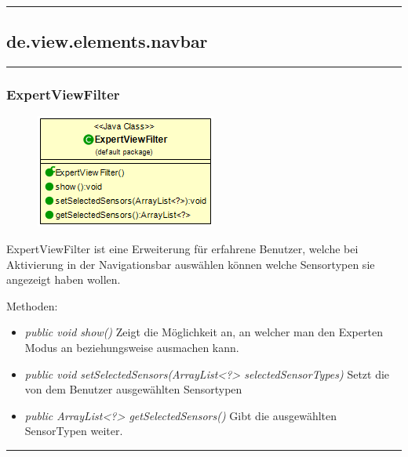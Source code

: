 \rule{\textwidth}{0.4pt}
\subsection{de.view.elements.navbar}

\rule{\textwidth}{0.4pt}
\subsubsection{ExpertViewFilter}
\begin{minipage}{0.3\textwidth}
    \begin{figure}[H]
        {\centering\includegraphics[scale = 0.55
        ]{media/view/navbar/ExpertviewFilter_Class.png}}
    \end{figure}
    \end{minipage} \hfill
    \begin{minipage}{0.6\textwidth}
ExpertViewFilter ist eine Erweiterung für erfahrene Benutzer, welche bei Aktivierung in der Navigationsbar auswählen können welche Sensortypen sie angezeigt haben wollen.
\end{minipage}
\vspace{\baselineskip}
Methoden: \begin{itemize} [noitemsep]
    \item \emph{public void show()} Zeigt die Möglichkeit an, an welcher man den Experten Modus an beziehungsweise ausmachen kann.
    \item \emph{public void setSelectedSensors(ArrayList<?> selectedSensorTypes)} Setzt die von dem Benutzer ausgewählten Sensortypen
    \item \emph{public ArrayList<?> getSelectedSensors()} Gibt die ausgewählten SensorTypen weiter.
\end{itemize}

\rule{\textwidth}{0.4pt}
